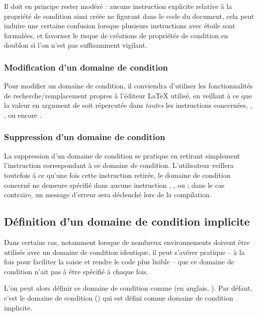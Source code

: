 \documentclass{article}
\newcommand\Latex{\LaTeX\xspace} %
\begin{document}
Il doit en principe rester modéré : aucune instruction explicite relative à la propriété de condition ainsi créée ne figurant dans le code du document, cela peut induire une certaine confusion lorsque plusieurs instructions  avec étoile sont formulées, et favoriser le risque de créations de propriétés de condition en doublon si l'on n'est pas suffisamment vigilant.

\subsubsection{Modification d'un domaine de condition}
Pour modifier un domaine de condition, il conviendra d'utiliser les fonctionnalités de recherche/remplacement propres à l'éditeur \Latex utilisé, en veillant à ce que la valeur  en argument de  soit répercutée dans \emph{toutes} les instructions concernées, , ,  ou encore .

\subsubsection{Suppression d'un domaine de condition}
La suppression d'un domaine de condition se pratique en retirant simplement l'instruction  correspondant à ce domaine de condition. L'utilisateur veillera toutefois à ce qu'une fois cette instruction retirée, le domaine de condition concerné ne demeure spécifié dans aucune instruction , ,  ou  ; dans le cas contraire, un message d'erreur sera déclenché lors de la compilation.

\subsection{Définition d'un domaine de condition implicite}\label{CtDoc_Commandes_SetImplicitCondiField}
Dans certains cas, notamment lorsque de nombreux environnements  doivent être utilisés avec un domaine de condition identique, il peut s'avérer pratique -- à la fois pour faciliter la saisie et rendre le code plus lisible -- que ce domaine de condition n'ait pas à être spécifié à chaque fois.

L'on peut alors définir ce domaine de condition comme  (en anglais, ). Par défaut, c'est le domaine de condition  () qui est défini comme domaine de condition implicite.
\end{document}
